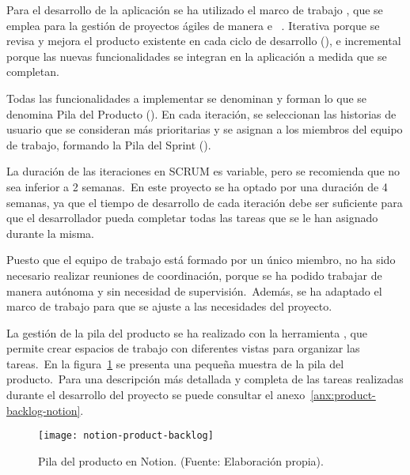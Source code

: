 
Para el desarrollo de la aplicación se ha utilizado el marco de trabajo , que se emplea para la gestión
de proyectos ágiles de manera  e ~\cite{scrum:book}.
Iterativa porque se revisa y mejora
el producto existente en cada ciclo de desarrollo (), e incremental porque las nuevas
funcionalidades se integran en la aplicación a medida que se completan.

Todas las funcionalidades a implementar se
denominan  y forman lo que se denomina Pila del Producto ().
En cada iteración, se seleccionan las historias de usuario que se consideran más prioritarias y se asignan a los
miembros del equipo de trabajo, formando la Pila del Sprint ().

La duración de las iteraciones en SCRUM es variable, pero se recomienda que no sea inferior a 2 semanas.\ En este
proyecto se ha optado por una duración de 4 semanas, ya que el tiempo de desarrollo de cada iteración debe ser
suficiente para que el desarrollador pueda completar todas las tareas que se le han asignado durante la misma.

Puesto que el equipo de trabajo está formado por un único miembro, no ha sido necesario realizar reuniones de
coordinación, porque se ha podido trabajar de manera autónoma y sin necesidad de supervisión.\ Además, se ha
adaptado el marco de trabajo para que se ajuste a las necesidades del proyecto.

La gestión de la pila del producto se ha realizado con la herramienta , que permite crear espacios
de trabajo con diferentes vistas para organizar las tareas.\ En la figura~\ref{fig:notion-product-backlog} se presenta
una pequeña muestra de la pila del producto.\ Para una descripción más detallada y completa de las tareas realizadas
durante el desarrollo del proyecto se puede consultar el anexo~\ref{anx:product-backlog-notion}.

\begin{figure}[H]
	\centering
	\texttt{[image: notion-product-backlog]}
	\caption{Pila del producto en Notion. (Fuente: Elaboración propia).}
	\label{fig:notion-product-backlog}
\end{figure}
